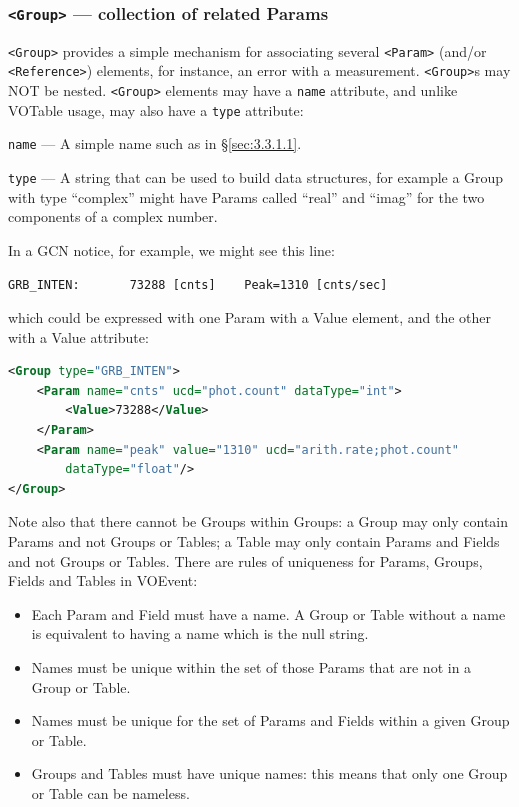 \documentclass[11pt,a4paper]{ivoa}
\begin{document}
\subsubsection{{\tt <Group>} --- collection of related Params}
\label{sec:3.3.2}
{\tt <Group>} provides a simple mechanism for associating several {\tt <Param>} 
(and/or {\tt <Reference>}) elements, for instance, an error with a measurement. 
{\tt <Group>}s may NOT be nested. {\tt <Group>} elements may have a {\tt name} 
attribute, and unlike VOTable usage, may also have a {\tt type} attribute: 

 {\tt name}\label{sec:3.3.2.1} --- A simple name such as 
in \S\ref{sec:3.3.1.1}. 

 {\tt type}\label{sec:3.3.2.2} --- A string that can be 
used to build data structures, for example a Group with type ``complex'' might 
have Params called ``real'' and ``imag'' for the two components of a complex 
number. 

In a GCN notice, for example, we might see this line: 
\begin{lstlisting}[language=XML]
GRB_INTEN:       73288 [cnts]    Peak=1310 [cnts/sec] 
\end{lstlisting}
which could be expressed with one Param with a Value element, and the other with 
a Value attribute: 
\begin{lstlisting}[language=XML]
<Group type="GRB_INTEN">
    <Param name="cnts" ucd="phot.count" dataType="int">
        <Value>73288</Value>
    </Param>
    <Param name="peak" value="1310" ucd="arith.rate;phot.count" 
        dataType="float"/>
</Group> 
\end{lstlisting}
Note also that there cannot be Groups within Groups: a Group may only contain 
Params and not Groups or Tables; a Table may only contain Params and Fields and 
not Groups or Tables. There are rules of uniqueness for Params, Groups, Fields 
and Tables in VOEvent: 
\begin{itemize}
\item Each Param and Field must have a name. A Group or Table without a name is 
equivalent to having a name which is the null string. 
\item Names must be unique within the set of those Params that are not in a 
Group or Table.
\item Names must be unique for the set of Params and Fields within a given Group 
or Table.
\item Groups and Tables must have unique names: this means that only one Group 
or Table can be nameless.
\end{itemize}
\end{document}
